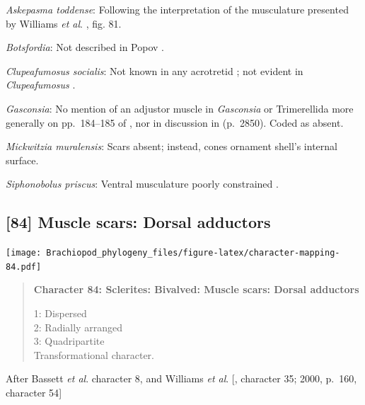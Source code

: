 \documentclass[openany]{book}
\begin{document}
\hypertarget{Askepasma_toddense-coding-83}{}
\emph{Askepasma toddense}: Following the interpretation of the
musculature presented by Williams \emph{et al}.
\citeyearpar{Williams2000LinguliformeaCraniiformea}, fig. 81.

\hypertarget{Botsfordia-coding-83}{}
\emph{Botsfordia}: Not described in Popov
\citeyearpar{Popov1992TheCambrian}.

\hypertarget{Clupeafumosus_socialis-coding-83}{}
\emph{Clupeafumosus socialis}: Not known in any acrotretid
\citep{Williams2000LinguliformeaCraniiformea}; not evident in
\emph{Clupeafumosus} \citep{Topper2013Reappraisalof}.

\hypertarget{Gasconsia-coding-83}{}
\emph{Gasconsia}: No mention of an adjustor muscle in \emph{Gasconsia}
or Trimerellida more generally on pp.~184--185 of
\citet{Williams2000LinguliformeaCraniiformea}, nor in discussion in
\citet{Williams2007Supplement} (p.~2850). Coded as absent.

\hypertarget{Mickwitzia_muralensis-coding-83}{}
\emph{Mickwitzia muralensis}: Scars absent; instead, cones ornament
shell's internal surface.

\hypertarget{Siphonobolus_priscus-coding-83}{}
\emph{Siphonobolus priscus}: Ventral musculature poorly constrained
\citep{Williams2000LinguliformeaCraniiformea, Popov2009Earlyontogeny}.

\subsection*{{[}84{]} Muscle scars: Dorsal
adductors}\label{muscle-scars-dorsal-adductors}

\texttt{[image: Brachiopod\_phylogeny\_files/figure-latex/character-mapping-84.pdf]}

\begin{quote}
\textbf{Character 84: Sclerites: Bivalved: Muscle scars: Dorsal
adductors}

1: Dispersed\\
2: Radially arranged\\
3: Quadripartite\\
Transformational character.
\end{quote}

After Bassett \emph{et al}.
\citeyearpar{Bassett2001Functionalmorphology} character 8, and Williams
\emph{et al}. {[}\citet{Williams1996Asupra}, character 35; 2000, p.~160,
character 54{]}
\end{document}
